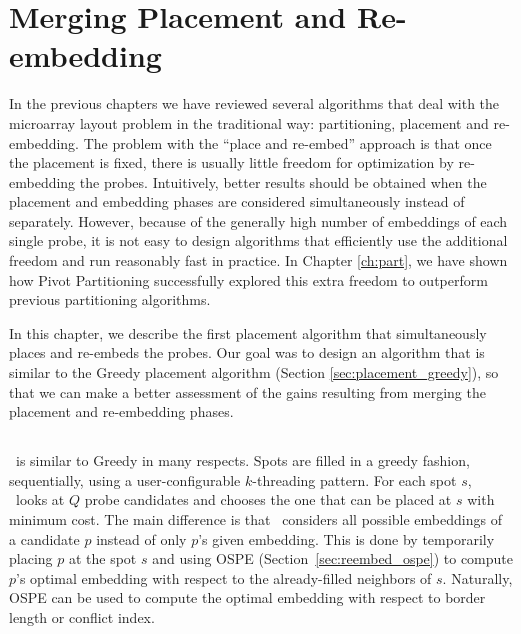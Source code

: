 \chapter{Merging Placement and Re-embedding}
\label{ch:merge}

In the previous chapters we have reviewed several algorithms that deal with the
microarray layout problem in the traditional way: partitioning, placement and
re-embedding. The problem with the ``place and re-embed'' approach is that once
the placement is fixed, there is usually little freedom for optimization by
re-embedding the probes. Intuitively, better results should be obtained when the
placement and embedding phases are considered simultaneously instead of
separately. However, because of the generally high number of embeddings of each
single probe, it is not easy to design algorithms that efficiently use the
additional freedom and run reasonably fast in practice. In Chapter
\ref{ch:part}, we have shown how Pivot Partitioning successfully explored this
extra freedom to outperform previous partitioning algorithms.

In this chapter, we describe the first placement algorithm that simultaneously
places and re-embeds the probes. Our goal was to design an algorithm that is
similar to the Greedy placement algorithm (Section \ref{sec:placement_greedy}),
so that we can make a better assessment of the gains resulting from merging the
placement and re-embedding phases.

\section{\Greedyplus}
\label{sec:merge_greedyplus}

\Greedyplus\ is similar to Greedy in many respects. Spots are filled in a greedy
fashion, sequentially, using a user-configurable $k$-threading pattern. For each
spot $s$, \Greedyplus\ looks at $Q$ probe candidates and chooses the one that
can be placed at $s$ with minimum cost. The main difference is that \Greedyplus\
considers all possible embeddings of a candidate $p$ instead of only $p$'s given
embedding. This is done by temporarily placing $p$ at the spot $s$ and using
OSPE (Section~\ref{sec:reembed_ospe}) to compute $p$'s optimal embedding with
respect to the already-filled neighbors of $s$. Naturally, OSPE can be used to
compute the optimal embedding with respect to border length or conflict index.

